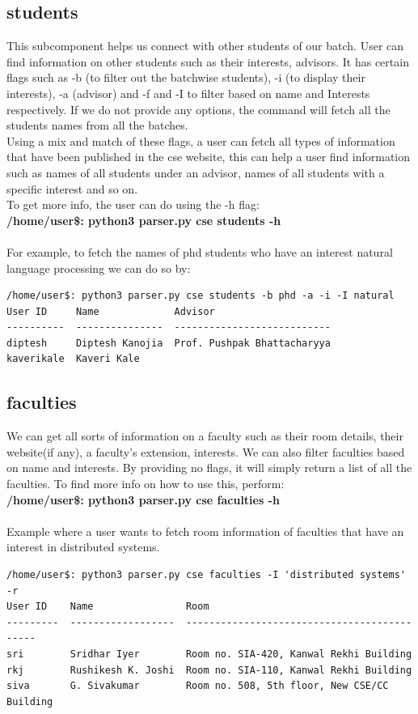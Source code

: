 \documentclass[12pt, letterpaper, twoside]{article}
\begin{document}
\subsection{students}
This subcomponent helps us connect with other students of our batch. 
User can find information on other students such as their interests, advisors.
It has certain flags such as -b (to filter out the batchwise students), -i (to display their interests), -a (advisor)
and -f and -I to filter based on name and Interests respectively.
If we do not provide any options, the command will fetch all the students names from all the batches.\\
Using a mix and match of these flags, a user can fetch all types of information
that have been published in the cse website, this can help a user find information such as names of all students
under an advisor, names of all students with a specific interest and so on.\\
To get more info, the user can do using the -h flag:\\
\textbf{/home/user\$: python3 parser.py cse students -h}\\
\\
For example, to fetch the names of phd students who have an interest natural language processing
we can do so by:\\
\begin{verbatim}
/home/user$: python3 parser.py cse students -b phd -a -i -I natural
User ID     Name             Advisor                      
----------  ---------------  ---------------------------  
diptesh     Diptesh Kanojia  Prof. Pushpak Bhattacharyya  
kaverikale  Kaveri Kale                                   
\end{verbatim}

\subsection{faculties}
We can get all sorts of information on a faculty such as their room details, their website(if any),
a faculty's extension, interests. We can also filter faculties based on name
and interests. By providing no flags, it will simply return a list of all the faculties.
To find more info on how to use this, perform:\\
\textbf{/home/user\$: python3 parser.py cse faculties -h}\\
\\
Example where a user wants to fetch room information of faculties that 
have an interest in distributed systems. 
\begin{verbatim}
/home/user$: python3 parser.py cse faculties -I 'distributed systems' -r
User ID    Name                Room                                          
---------  ------------------  --------------------------------------------  
sri        Sridhar Iyer        Room no. SIA-420, Kanwal Rekhi Building       
rkj        Rushikesh K. Joshi  Room no. SIA-110, Kanwal Rekhi Building 
siva       G. Sivakumar        Room no. 508, 5th floor, New CSE/CC Building 
\end{verbatim}
\end{document}
